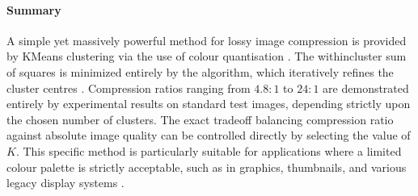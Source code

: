 \paragraph{Summary}
A simple yet massively powerful method for lossy image compression is provided by KMeans clustering via the use of colour quantisation \cite{Khaleel2014}. The withincluster sum of squares is minimized entirely by the algorithm, which iteratively refines the cluster centres \cite{Khaleel2014}. Compression ratios ranging from $4.8:1$ to $24:1$ are demonstrated entirely by experimental results on standard test images, depending strictly upon the chosen number of clusters. The exact tradeoff balancing compression ratio against absolute image quality can be controlled directly by selecting the value of $K$. This specific method is particularly suitable for applications where a limited colour palette is strictly acceptable, such as in graphics, thumbnails, and various legacy display systems \cite{Khaleel2014}.
